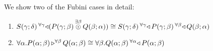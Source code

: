 \documentclass{llncs}
\begin{document}
\begin{lemma}[Fubini]
  We show two of the Fubini cases in detail:

  \begin{enumerate}
  \item $\homlallXYtoZ {\gamma} {(\tensorexistsXwithYandZ \beta {\harrapp P \gamma \beta} {\harrapp Q \beta \alpha})} {\harrapp S \gamma \delta} \cong \homlallXYtoZ \beta {\harrapp Q \beta \alpha} {\homlallXYtoZ \gamma {\harrapp P \gamma \beta} {\harrapp S \gamma \delta}}$
  \item $\pendallXdotY \alpha \homrallXYtoZ \beta {\harrapp P \alpha \beta} {\harrapp Q \alpha \beta} \cong \pendallXdotY \beta \homlallXYtoZ \alpha {\harrapp P \alpha \beta} {\harrapp Q \alpha \beta}$
  \end{enumerate}
\end{lemma}
\end{document}
